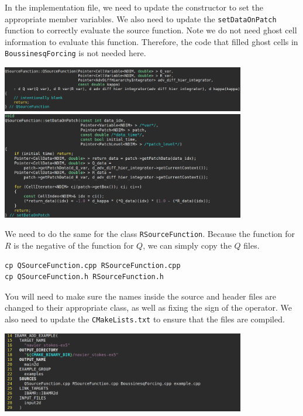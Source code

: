 \documentclass{article}
\begin{document}
In the implementation file, we need to update the constructor to set the appropriate member variables. We also need to update the \verb|setDataOnPatch| function to correctly evaluate the source function. Note we do not need ghost cell information to evaluate this function. Therefore, the code that filled ghost cells in \verb|BoussinesqForcing| is not needed here.
\begin{center}
\includegraphics[width=0.8\textwidth]{Graphs/NS-ex5/add_src/source_constructor.png} \\
\vspace{0.5em}
\includegraphics[width=0.8\textwidth]{Graphs/NS-ex5/add_src/source_setDataOnPatch.png}
\end{center}

We need to do the same for the class \verb|RSourceFunction|. Because the function for $R$ is the negative of the function for $Q$, we can simply copy the $Q$ files.
\begin{verbatim}
cp QSourceFunction.cpp RSourceFunction.cpp
cp QSourceFunction.h RSourceFunction.h
\end{verbatim}
You will need to make sure the names inside the source and header files are changed to their appropriate class, as well as fixing the sign of the operator. We also need to update the \verb|CMakeLists.txt| to ensure that the files are compiled.
\begin{center}
\includegraphics[width=0.8\textwidth]{Graphs/NS-ex5/add_src/cmake_lists.png}
\end{center}
\end{document}
